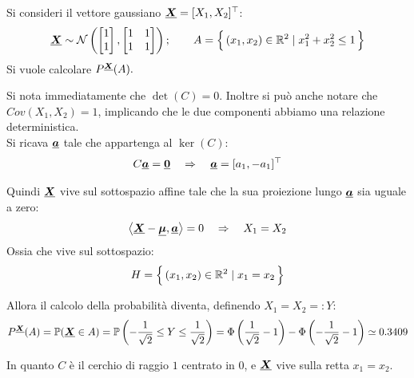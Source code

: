 \begin{esempio}
    Si consideri il vettore gaussiano $\underline{{\boldsymbol{X}}} = [X_1, X_2]^\top$:
    \[\underline{{\boldsymbol{X}}}\sim\mathcal{N}\left(\begin{bmatrix} 1\\1\end{bmatrix}, \begin{bmatrix}
    1 & 1 \\
    1 & 1 \\
\end{bmatrix}\right);\qquad A = \Bigl\{\,(x_1, x_2)\in\mathbb{R}^2\mid x_1^2+x_2^2\leq1\,\Bigr\}\]
Si vuole calcolare $P^{\underline{{\boldsymbol{X}}}}(A).$

\medskip
\noindent Si nota immediatamente che $\det(C) = 0$. Inoltre si può anche notare che $Cov(X_1, X_2)=1$, implicando che le due componenti abbiamo una relazione deterministica.\\
Si ricava $\underline{{\boldsymbol{a}}}$ tale che appartenga al $\ker(C)$:
\[C\underline{{\boldsymbol{a}}} = \underline{{\boldsymbol{0}}} \quad \Rightarrow \quad \underline{{\boldsymbol{a}}} = [a_1, -a_1]^\top\]

Quindi $\underline{{\boldsymbol{X}}}$ vive sul sottospazio affine tale che la sua proiezione lungo $\underline{{\boldsymbol{a}}}$ sia uguale a zero:
\[\left\langle\underline{{\boldsymbol{X}}} - \underline{{\boldsymbol{\mu}}}, \underline{{\boldsymbol{a}}}\right\rangle = 0 \quad \Rightarrow \quad X_1=X_2\]
Ossia che vive sul sottospazio:
\[H = \Bigl\{\,(x_1, x_2)\in\mathbb{R}^2\mid x_1=x_2\,\Bigr\}\]

Allora il calcolo della probabilità diventa, definendo $X_1 = X_2 =: Y$:
\[P^{\underline{{\boldsymbol{X}}}}(A) = \mathbb{P}(\underline{{\boldsymbol{X}}}\in A) = \mathbb{P}\left(-\frac{1}{\sqrt{2}}\leq Y\leq \frac{1}{\sqrt{2}}\right) = \Phi\left(\frac{1}{\sqrt{2}}-1\right) - \Phi\left(-\frac{1}{\sqrt{2}}-1\right) \simeq 0.3409\]

In quanto $C$ è il cerchio di raggio $1$ centrato in $0$, e $\underline{{\boldsymbol{X}}}$ vive sulla retta $x_1=x_2$.

\begin{figure}[H]
\centering
{}

\label{fig:gaussiana_degenere_cerchio}
\end{figure}




\end{esempio}

